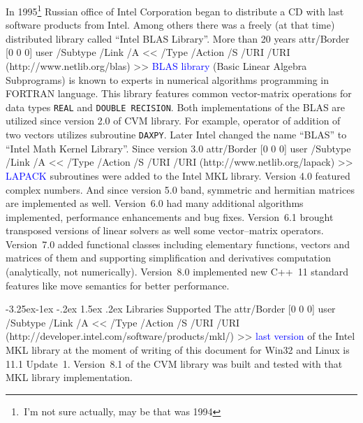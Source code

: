 \documentclass[12pt,letterpaper]{article}
\makeatletter
\newcommand{\URL}[2]{%
    \pdfstartlink attr{/Border [0 0 0]} user{%
    /Subtype /Link
    /A <<
        /Type /Action
        /S /URI
        /URI (#2)
    >>}%
\textcolor{blue}{#1}%
\pdfendlink}
\newcommand{\FORTRAN}{\textsf{FORTRAN}\xspace}
\newcommand{\CVMVERSION}{8.1\xspace}
\newcommand{\MKLVERSION}{11.1 Update~1\xspace}
\renewcommand\subsection{\@startsection{subsection}{2}{0mm}%
                                     {-3.25ex\@plus -1ex \@minus -.2ex}%
                                     {1.5ex \@plus .2ex}%
                                     {\normalfont\large\bfseries\sffamily}}
\makeatother
\begin{document}
In 1995\footnote{\,I'm not sure actually, may be that was 1994}
Russian office of Intel Corporation began to distribute a CD with
last software products from Intel. Among others there was a freely
(at that time) distributed library called ``Intel BLAS Library''.
More than 20 years \URL{BLAS library}{http://www.netlib.org/blas}
(Basic Linear Algebra Subprograms) is known to experts in numerical
algorithms programming in \FORTRAN language. This library features
common vector-matrix operations for data types \verb"REAL" and
\verb"DOUBLE RECISION". 
Both implementations of the BLAS are utilized since version 2.0 of
CVM library. For example, operator of addition of two vectors
utilizes subroutine \verb"DAXPY". Later Intel changed the name
``BLAS'' to ``Intel Math Kernel Library''. Since version 3.0
\URL{LAPACK}{http://www.netlib.org/lapack} subroutines were
added to the Intel MKL library.
Version 4.0 featured complex numbers. And since version
5.0 band, symmetric and hermitian matrices are implemented as well.
Version~6.0 had many additional algorithms implemented, performance 
enhancements and bug fixes. Version~6.1 brought transposed versions of 
linear solvers as well some vec\-tor--matrix operators.
Version~7.0 added functional classes including elementary functions,
vectors and matrices of them and supporting simplification and
derivatives computation (analytically, not numerically).
Version~8.0 implemented new C++~11 standard features like move semantics 
for better performance.

\subsection{Libraries Supported}
The
\URL{last version}{http://developer.intel.com/software/products/mkl/} of the
Intel MKL library at the moment of writing of this document for Win32 and
Linux is \MKLVERSION. Version~\CVMVERSION of the CVM library was 
built and tested with that MKL library implementation.

\end{document}
